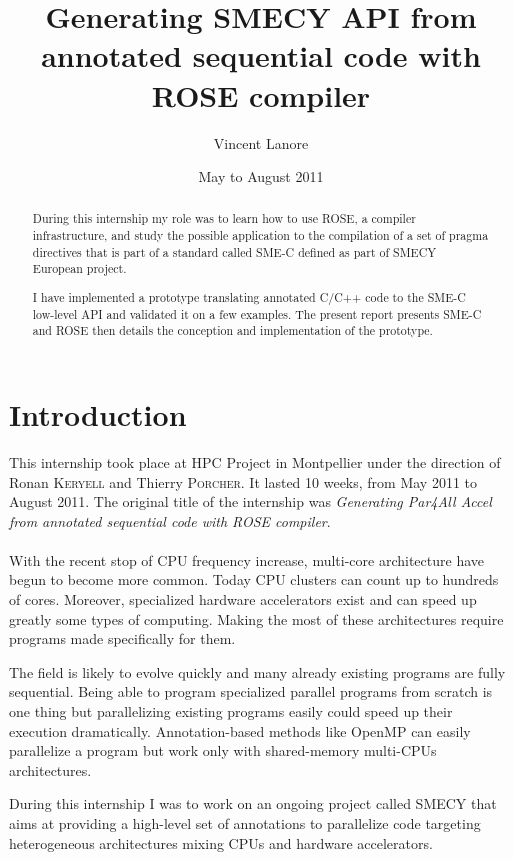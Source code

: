 \documentclass[a4paper]{article}
\title{Generating SMECY API from annotated sequential code with ROSE compiler}
\author{Vincent \sc Lanore}
\date{May to August 2011}
\begin{document}
	\maketitle
	
	\begin{abstract}
		During this internship my role was to learn how to use ROSE, a
        compiler infrastructure, and study the possible application to the
        compilation of a set of pragma directives that is part of a
        standard called SME-C defined as part of SMECY European project.
		
		I have implemented a prototype translating annotated C/C++ code to the SME-C low-level API and validated it on a few examples. The present report presents SME-C and ROSE then details the conception and implementation of the prototype.
	\end{abstract}
	
	\tableofcontents
	\newpage
	
\section*{Introduction}
	This internship took place at HPC Project in Montpellier under the
    direction of Ronan \textsc{Keryell} and Thierry \textsc{Porcher}. It lasted 10 weeks, from May 2011 to August 2011. The original title of the internship was \emph{Generating Par4All Accel from annotated sequential code with ROSE compiler}.
	
	\paragraph{}With the recent stop of CPU frequency increase, multi-core architecture have begun to become more common. Today CPU clusters can count up to hundreds of cores. Moreover, specialized hardware accelerators exist and can speed up greatly some types of computing.  Making the most of these architectures require programs made specifically for them. 
	
	The field is likely to evolve quickly and many already existing programs are fully sequential. Being able to program specialized parallel programs from scratch is one thing but parallelizing existing programs easily could speed up their execution dramatically. Annotation-based methods like OpenMP can easily parallelize a program but work only with shared-memory multi-CPUs architectures.
	
	During this internship I was to work on an ongoing project called SMECY that aims at providing a high-level set of annotations to parallelize code targeting heterogeneous architectures mixing CPUs and hardware accelerators.
	
\end{document}
